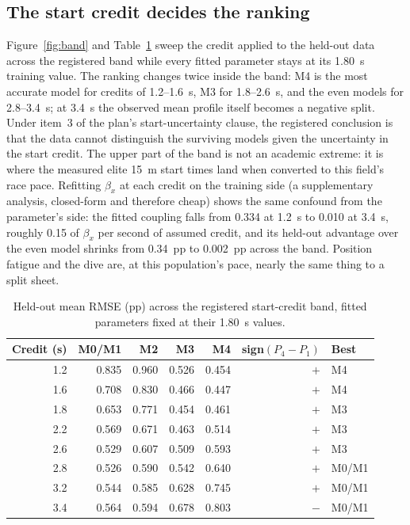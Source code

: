 \subsection{The start credit decides the ranking}

Figure~\ref{fig:band} and Table~\ref{tab:band} sweep the credit applied to
the held-out data across the registered band while every fitted parameter
stays at its 1.80~s training value. The ranking changes twice inside the
band: M4 is the most accurate model for credits of 1.2--1.6~s, M3 for
1.8--2.6~s, and the even models for 2.8--3.4~s; at 3.4~s the observed mean
profile itself becomes a negative split. Under item~3 of the plan's
start-uncertainty clause, the registered conclusion is that the data cannot
distinguish the surviving models given the uncertainty in the start credit.
The upper part of the band is not an academic extreme: it is where the
measured elite 15~m start times land when converted to this field's
race pace. Refitting $\beta_x$ at each credit on the training side (a
supplementary analysis, closed-form and therefore cheap) shows the same
confound from the parameter's side: the fitted coupling falls from 0.334 at
1.2~s to 0.010 at 3.4~s, roughly 0.15 of $\beta_x$ per second of assumed
credit, and its held-out advantage over the even model shrinks from
0.34~pp to 0.002~pp across the band. Position fatigue and the dive are, at
this population's pace, nearly the same thing to a split sheet.

\begin{table}[htbp]
\centering
\caption{Held-out mean RMSE (pp) across the registered start-credit band,
fitted parameters fixed at their 1.80~s values.}
\label{tab:band}
\begin{tabular}{rrrrrrl}
\toprule
Credit (s) & M0/M1 & M2 & M3 & M4 & sign$(P_4-P_1)$ & Best \\
\midrule
1.2 & 0.835 & 0.960 & 0.526 & 0.454 & $+$ & M4 \\
1.6 & 0.708 & 0.830 & 0.466 & 0.447 & $+$ & M4 \\
1.8 & 0.653 & 0.771 & 0.454 & 0.461 & $+$ & M3 \\
2.2 & 0.569 & 0.671 & 0.463 & 0.514 & $+$ & M3 \\
2.6 & 0.529 & 0.607 & 0.509 & 0.593 & $+$ & M3 \\
2.8 & 0.526 & 0.590 & 0.542 & 0.640 & $+$ & M0/M1 \\
3.2 & 0.544 & 0.585 & 0.628 & 0.745 & $+$ & M0/M1 \\
3.4 & 0.564 & 0.594 & 0.678 & 0.803 & $-$ & M0/M1 \\
\bottomrule
\end{tabular}
\end{table}

